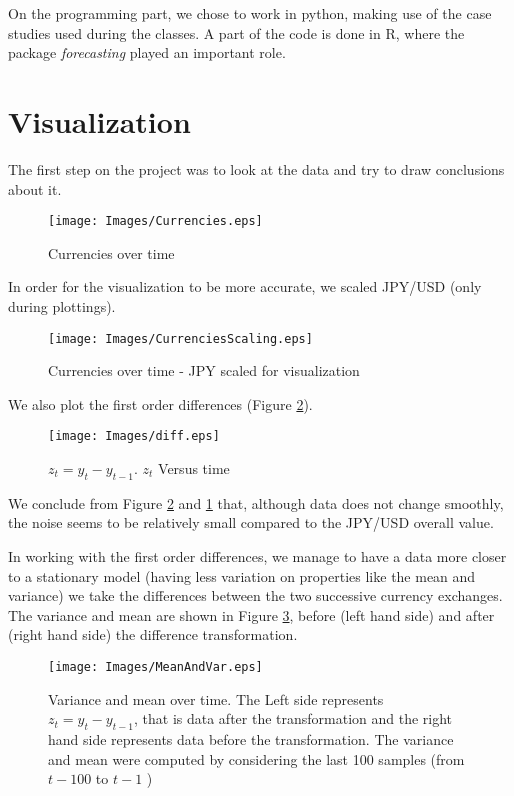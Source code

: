 On the programming part, we chose to work in python, making use of the case studies used during 
the classes. A part of the code is done in R, where the 
package \textit{forecasting} played an important role.

\section{Visualization}

The first step on the project was to look at the data and try to draw conclusions about it.

\begin{figure}[!ht]
	\centering
	\texttt{[image: Images/Currencies.eps]}
	\caption{Currencies over time}
	\label{fig:Currencies}
\end{figure} 

In order for the visualization to be more accurate, we scaled JPY/USD (only during plottings).

\begin{figure}[!ht]
	\centering
	\texttt{[image: Images/CurrenciesScaling.eps]}
	\caption{Currencies over time - JPY scaled for visualization}
\end{figure}

We also plot the first order differences (Figure \ref{fig:diff}).

\begin{figure}[!ht]
	\centering
	\texttt{[image: Images/diff.eps]}
	\caption{$z_t = y_t - y_{t-1}$. $z_t$ Versus time}
	\label{fig:diff}
\end{figure}

We conclude from Figure \ref{fig:diff} and \ref{fig:Currencies} that, although data does not change smoothly, the noise seems to be relatively small compared to the JPY/USD overall value.

In working with the first order differences, we manage to have a data more closer to a stationary model (having less variation on properties like the mean and variance) 
we take the differences between the two successive currency exchanges. The variance and mean are
shown in Figure \ref{fig:meanVar}, before (left hand side) and after (right hand side) the difference transformation.

\begin{figure}[!ht]
	\centering
	\texttt{[image: Images/MeanAndVar.eps]}
	\caption{Variance and mean over time. The Left side represents $z_t = y_t - y_{t-1}$, that 
		is data after the transformation and the right hand side represents 
		data before the transformation.
		The variance and mean were computed by considering the last 100 samples	(from $t-100$ to $t-1$ )}
	\label{fig:meanVar}
\end{figure}

